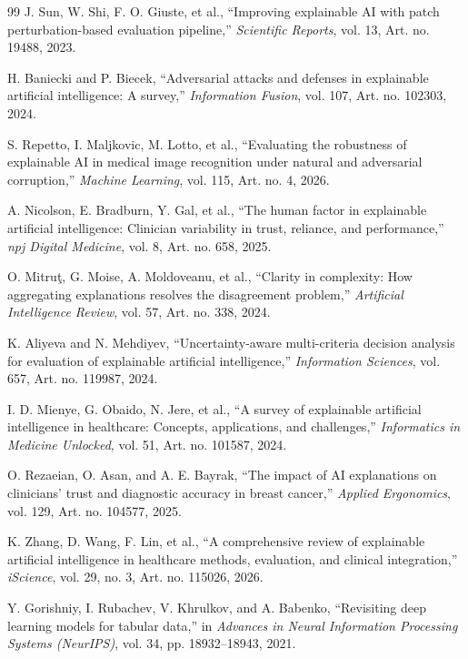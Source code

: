 \documentclass[3p,times,procedia]{elsarticle}
\theoremstyle{definition}
\begin{document}
\begin{thebibliography}{99}
J. Sun, W. Shi, F. O. Giuste, et al.,
``Improving explainable AI with patch perturbation-based evaluation pipeline,''
\textit{Scientific Reports},
vol. 13, Art. no. 19488, 2023.

H. Baniecki and P. Biecek,
``Adversarial attacks and defenses in explainable artificial intelligence: A survey,''
\textit{Information Fusion},
vol. 107, Art. no. 102303, 2024.

S. Repetto, I. Maljkovic, M. Lotto, et al.,
``Evaluating the robustness of explainable AI in medical image recognition under natural and adversarial corruption,''
\textit{Machine Learning},
vol. 115, Art. no. 4, 2026.

A. Nicolson, E. Bradburn, Y. Gal, et al.,
``The human factor in explainable artificial intelligence: Clinician variability in trust, reliance, and performance,''
\textit{npj Digital Medicine},
vol. 8, Art. no. 658, 2025.

O. Mitru\c{t}, G. Moise, A. Moldoveanu, et al.,
``Clarity in complexity: How aggregating explanations resolves the disagreement problem,''
\textit{Artificial Intelligence Review},
vol. 57, Art. no. 338, 2024.

K. Aliyeva and N. Mehdiyev,
``Uncertainty-aware multi-criteria decision analysis for evaluation of explainable artificial intelligence,''
\textit{Information Sciences},
vol. 657, Art. no. 119987, 2024.

I. D. Mienye, G. Obaido, N. Jere, et al.,
``A survey of explainable artificial intelligence in healthcare: Concepts, applications, and challenges,''
\textit{Informatics in Medicine Unlocked},
vol. 51, Art. no. 101587, 2024.

O. Rezaeian, O. Asan, and A. E. Bayrak,
``The impact of AI explanations on clinicians' trust and diagnostic accuracy in breast cancer,''
\textit{Applied Ergonomics},
vol. 129, Art. no. 104577, 2025.

K. Zhang, D. Wang, F. Lin, et al.,
``A comprehensive review of explainable artificial intelligence in healthcare methods, evaluation, and clinical integration,''
\textit{iScience},
vol. 29, no. 3, Art. no. 115026, 2026.

Y. Gorishniy, I. Rubachev, V. Khrulkov, and A. Babenko,
``Revisiting deep learning models for tabular data,''
in \textit{Advances in Neural Information Processing Systems (NeurIPS)},
vol. 34, pp. 18932--18943, 2021.


\end{thebibliography}
\end{document}
